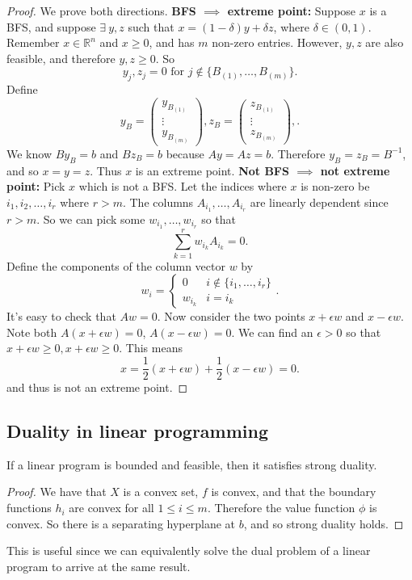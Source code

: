 \documentclass[egregdoesnotlikesansseriftitles,a4paper]{scrartcl}
\begin{document}
\begin{proof}
	 We prove both directions.\newline 
	 \textbf{BFS $\implies $ extreme point:}\newline 
	 Suppose $x$ is a BFS, and suppose $\exists \ y,z$ such that $x=(1-\delta)y+\delta z$, where $\delta \in (0,1)$. Remember $x \in \mathbb{R}^{n} $ and $x \geq 0$, and has $m$ non-zero entries. However, $y,z$ are also feasible, and therefore $y,z \geq 0$. So 
	 \[y_j,z_j=0 \text{ for } j \notin \{B_{(1)},\ldots ,B_{(m)}\}.\]
	 Define 
	 \[y_B=\begin{pmatrix}
	 y_{B_{(1)}}\\ \vdots \\ y_{B_{(m)}}
	 \end{pmatrix},
	 z_B=\begin{pmatrix}
		z_{B_{(1)}}\\ \vdots \\z_{B_{(m)}} 
		\end{pmatrix},
	 .\]
	 We know $B y_B=b$ and $B z_B=b$ because $Ay=Az=b$. Therefore $y_B=z_B=B^{-1}$, and so $x=y=z$. Thus $x$ is an extreme point.\newline 
	 \textbf{Not BFS $\implies $ not extreme point:}\newline 
	 Pick $x$ which is not a BFS. Let the indices where $x$ is non-zero be $i_1,i_2,\ldots , i_r$ where $r>m$. The columns $A_{i_1},\ldots ,A_{i_r}$ are linearly dependent since $r>m$. So we can pick some $w_{i_1},\ldots ,w_{i_r}$ so that 
	 \[\sum_{k=1}^{r}w_{i_k}A_{i_k}=0.\]
	 Define the components of the column vector $w$ by 
	 \[w_i=\begin{cases}
		 0 & i \notin \{i_1,\ldots , i_r\}\\
		 w_{i_k} & i=i_k
	 \end{cases}
	 .\]
	 It's easy to check that $Aw=0$. Now consider the two points $x+\epsilon w$ and $x- \epsilon w$. Note both $A (x+\epsilon w)=0$, $A (x-\epsilon w)=0$. We can find an $\epsilon>0$ so that $x+\epsilon w \geq 0 , x+\epsilon w \geq 0$. This means 
	 \[x= \frac{1}{2}(x+\epsilon w)+\frac{1}{2}(x-\epsilon w)=0.\]
	 and thus is not an extreme point.
	 
\end{proof}

\subsection{Duality in linear programming}
\begin{theorem}
	 If a linear program is bounded and feasible, then it satisfies strong duality.
\end{theorem}
\begin{proof}
	 We have that $X$ is a convex set, $f$ is convex, and that the boundary functions $h_i$ are convex for all $1 \leq i \leq m$. Therefore the value function $\phi$ is convex. So there is a separating hyperplane at $b$, and so strong duality holds.
\end{proof}
\begin{remark}
	 This is useful since we can equivalently solve the dual problem of a linear program to arrive at the same result.
\end{remark}
\end{document}
